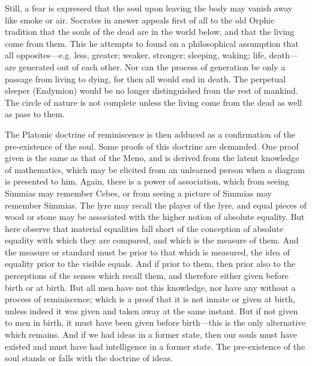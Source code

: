 Still, a fear is expressed that the soul upon leaving the body may vanish
away like smoke or air. Socrates in answer appeals first of all to the old
Orphic tradition that the souls of the dead are in the world below, and
that the living come from them. This he attempts to found on a
philosophical assumption that all opposites—e.g. less, greater;
weaker, stronger; sleeping, waking; life, death—are generated out of
each other. Nor can the process of generation be only a passage from
living to dying, for then all would end in death. The perpetual sleeper
(Endymion) would be no longer distinguished from the rest of mankind. The
circle of nature is not complete unless the living come from the dead as
well as pass to them.

The Platonic doctrine of reminiscence is then adduced as a confirmation of
the pre-existence of the soul. Some proofs of this doctrine are demanded.
One proof given is the same as that of the Meno, and is derived from the
latent knowledge of mathematics, which may be elicited from an unlearned
person when a diagram is presented to him. Again, there is a power of
association, which from seeing Simmias may remember Cebes, or from seeing
a picture of Simmias may remember Simmias. The lyre may recall the player
of the lyre, and equal pieces of wood or stone may be associated with the
higher notion of absolute equality. But here observe that material
equalities fall short of the conception of absolute equality with which
they are compared, and which is the measure of them. And the measure or
standard must be prior to that which is measured, the idea of equality
prior to the visible equals. And if prior to them, then prior also to the
perceptions of the senses which recall them, and therefore either given
before birth or at birth. But all men have not this knowledge, nor have
any without a process of reminiscence; which is a proof that it is not
innate or given at birth, unless indeed it was given and taken away at the
same instant. But if not given to men in birth, it must have been given
before birth—this is the only alternative which remains. And if we
had ideas in a former state, then our souls must have existed and must
have had intelligence in a former state. The pre-existence of the soul
stands or falls with the doctrine of ideas.


